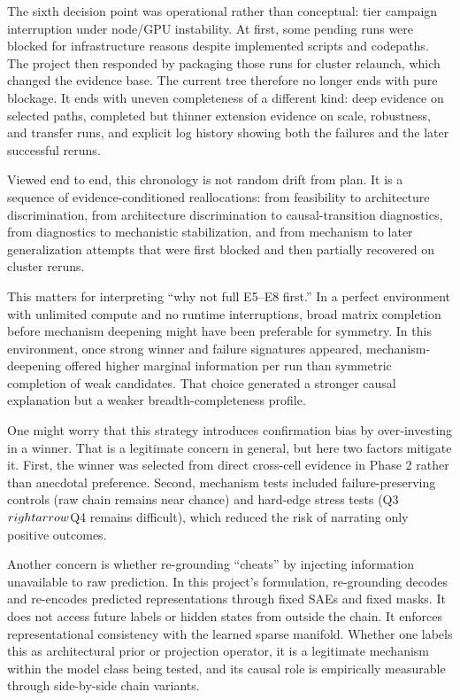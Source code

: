 \documentclass[11pt]{article}
\begin{document}
The sixth decision point was operational rather than conceptual: tier campaign interruption under node/GPU instability. At first, some pending runs were blocked for infrastructure reasons despite implemented scripts and codepaths. The project then responded by packaging those runs for cluster relaunch, which changed the evidence base. The current tree therefore no longer ends with pure blockage. It ends with uneven completeness of a different kind: deep evidence on selected paths, completed but thinner extension evidence on scale, robustness, and transfer runs, and explicit log history showing both the failures and the later successful reruns.

Viewed end to end, this chronology is not random drift from plan. It is a sequence of evidence-conditioned reallocations: from feasibility to architecture discrimination, from architecture discrimination to causal-transition diagnostics, from diagnostics to mechanistic stabilization, and from mechanism to later generalization attempts that were first blocked and then partially recovered on cluster reruns.

This matters for interpreting ``why not full E5--E8 first.'' In a perfect environment with unlimited compute and no runtime interruptions, broad matrix completion before mechanism deepening might have been preferable for symmetry. In this environment, once strong winner and failure signatures appeared, mechanism-deepening offered higher marginal information per run than symmetric completion of weak candidates. That choice generated a stronger causal explanation but a weaker breadth-completeness profile.

One might worry that this strategy introduces confirmation bias by over-investing in a winner. That is a legitimate concern in general, but here two factors mitigate it. First, the winner was selected from direct cross-cell evidence in Phase 2 rather than anecdotal preference. Second, mechanism tests included failure-preserving controls (raw chain remains near chance) and hard-edge stress tests (Q3$\\rightarrow$Q4 remains difficult), which reduced the risk of narrating only positive outcomes.

Another concern is whether re-grounding ``cheats'' by injecting information unavailable to raw prediction. In this project's formulation, re-grounding decodes and re-encodes predicted representations through fixed SAEs and fixed masks. It does not access future labels or hidden states from outside the chain. It enforces representational consistency with the learned sparse manifold. Whether one labels this as architectural prior or projection operator, it is a legitimate mechanism within the model class being tested, and its causal role is empirically measurable through side-by-side chain variants.
\end{document}
